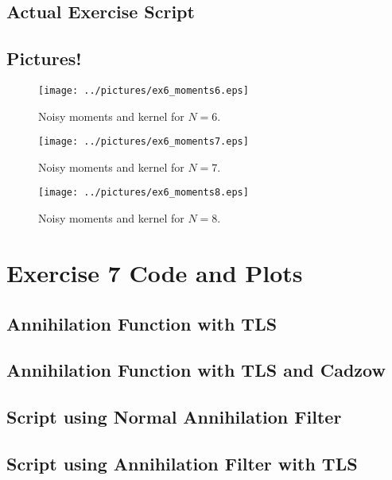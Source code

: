 \documentclass[11pt,a4paper]{report}
\begin{document}
\subsection{Actual Exercise Script}

\newpage

\subsection{Pictures!}

\begin{figure}[!ht]
    \centering
    \texttt{[image: ../pictures/ex6\_moments6.eps]}
    \caption{Noisy moments and kernel for $N = 6$.}
\end{figure}

\begin{figure}[!ht]
    \centering
    \texttt{[image: ../pictures/ex6\_moments7.eps]}
    \caption{Noisy moments and kernel for $N = 7$.}
\end{figure}

\begin{figure}[!ht]
    \centering
    \texttt{[image: ../pictures/ex6\_moments8.eps]}
    \caption{Noisy moments and kernel for $N = 8$.}
\end{figure}

\section{Exercise 7 Code and Plots}
\subsection{Annihilation Function with TLS}

\newpage

\subsection{Annihilation Function with TLS and Cadzow}

\newpage

\subsection{Script using Normal Annihilation Filter}

\newpage

\subsection{Script using Annihilation Filter with TLS}

\newpage
\end{document}
